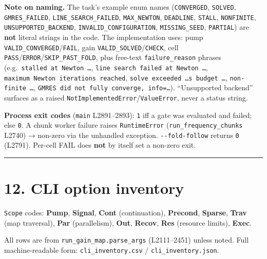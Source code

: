 \documentclass[
  10pt,
]{article}
\begin{document}
\textbf{Note on naming.} The task's example enum names
(\texttt{CONVERGED}, \texttt{SOLVED}, \texttt{GMRES\_FAILED},
\texttt{LINE\_SEARCH\_FAILED}, \texttt{MAX\_NEWTON}, \texttt{DEADLINE},
\texttt{STALL}, \texttt{NONFINITE}, \texttt{UNSUPPORTED\_BACKEND},
\texttt{INVALID\_CONFIGURATION}, \texttt{MISSING\_SEED},
\texttt{PARTIAL}) are \textbf{not} literal strings in the code. The
implementation uses: pump \texttt{VALID\_CONVERGED}/\texttt{FAIL}, gain
\texttt{VALID\_SOLVED}/\texttt{CHECK}, cell
\texttt{PASS}/\texttt{ERROR}/\texttt{SKIP\_PAST\_FOLD}, plus free-text
\texttt{failure\_reason} phrases (e.g.~\texttt{stalled\ at\ Newton\ …},
\texttt{line\ search\ failed\ at\ Newton\ …},
\texttt{maximum\ Newton\ iterations\ reached},
\texttt{solve\ exceeded\ …s\ budget\ …}, \texttt{non-finite\ …},
\texttt{GMRES\ did\ not\ fully\ converge,\ info=…}). ``Unsupported
backend'' surfaces as a raised
\texttt{NotImplementedError}/\texttt{ValueError}, never a status string.

\textbf{Process exit codes} (\texttt{main} L2891--2893): \texttt{1} iff
a gate was evaluated and failed; else \texttt{0}. A chunk worker failure
raises \texttt{RuntimeError} (\texttt{run\_frequency\_chunks} L2740) →
non-zero via the unhandled exception. \texttt{-\/-fold-follow} returns
\texttt{0} (L2791). Per-cell FAIL does \textbf{not} by itself set a
non-zero exit.

\begin{center}\rule{0.5\linewidth}{0.5pt}\end{center}

\section{12. CLI option inventory}\label{cli-option-inventory}

\texttt{Scope} codes: \textbf{Pump}, \textbf{Signal}, \textbf{Cont}
(continuation), \textbf{Precond}, \textbf{Sparse}, \textbf{Trav} (map
traversal), \textbf{Par} (parallelism), \textbf{Out}, \textbf{Recov},
\textbf{Res} (resource limits), \textbf{Exec}.

All rows are from \texttt{run\_gain\_map.parse\_args} (L2111--2451)
unless noted. Full machine-readable form: \texttt{cli\_inventory.csv} /
\texttt{cli\_inventory.json}.
\end{document}
